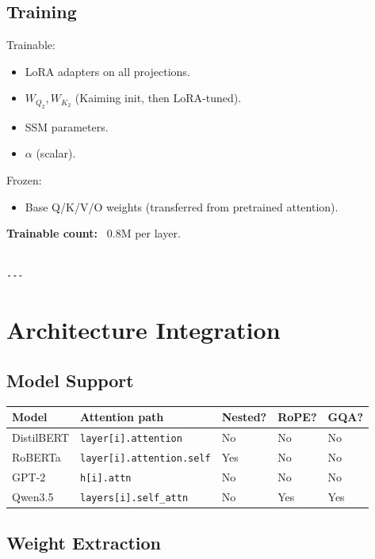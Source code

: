 \subsection{Training}

Trainable:
\begin{itemize}
\item LoRA adapters on all projections.
\item $W_{Q_2}, W_{K_2}$ (Kaiming init, then LoRA-tuned).
\item SSM parameters.
\item $\alpha$ (scalar).

\end{itemize}
Frozen:
\begin{itemize}
\item Base Q/K/V/O weights (transferred from pretrained attention).

\end{itemize}
\textbf{Trainable count:} ~0.8M per layer.
\begin{lstlisting}

---
\end{lstlisting}

\section{Architecture Integration}

\subsection{Model Support}

\begin{table}[H]
\centering
\small
\begin{tabular}{lllll}
\toprule
\textbf{Model} & \textbf{Attention path} & \textbf{Nested?} & \textbf{RoPE?} & \textbf{GQA?} \\
\midrule
DistilBERT & \texttt{layer[i].attention} & No & No & No \\
RoBERTa & \texttt{layer[i].attention.self} & Yes & No & No \\
GPT-2 & \texttt{h[i].attn} & No & No & No \\
Qwen3.5 & \texttt{layers[i].self\_attn} & No & Yes & Yes \\
\bottomrule
\end{tabular}
\end{table}

\subsection{Weight Extraction}

